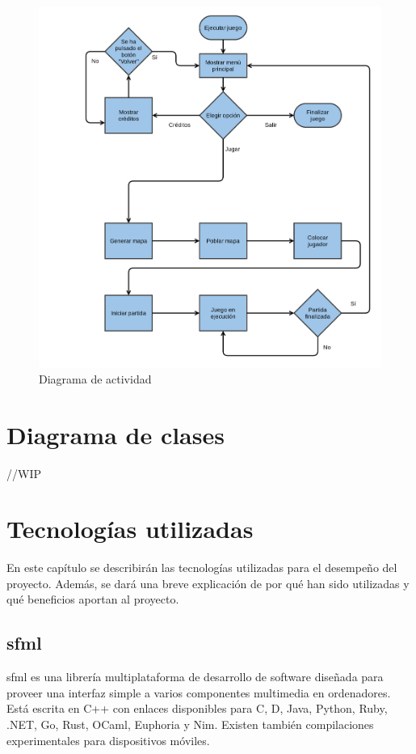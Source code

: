 	\begin{figure}[!htp]
		 \centering
		 \includegraphics{fig/actividad}
		 \caption{Diagrama de actividad}
		 \label{fig:activi}
	\end{figure}

	\FloatBarrier

\section{Diagrama de clases}
	
	//WIP

\section{Tecnologías utilizadas}

	En este capítulo se describirán las tecnologías utilizadas para el desempeño del proyecto. Además, se dará una breve explicación de por qué han sido utilizadas y qué beneficios aportan al proyecto.

	\subsection{\acrshort{sfml}}

		\acrfull{sfml} es una librería multiplataforma de desarrollo de software diseñada para proveer una interfaz simple a varios componentes multimedia en ordenadores. Está escrita en C++ con enlaces disponibles para C, D, Java, Python, Ruby, .NET, Go, Rust, OCaml, Euphoria y Nim. Existen también compilaciones experimentales para dispositivos móviles.

